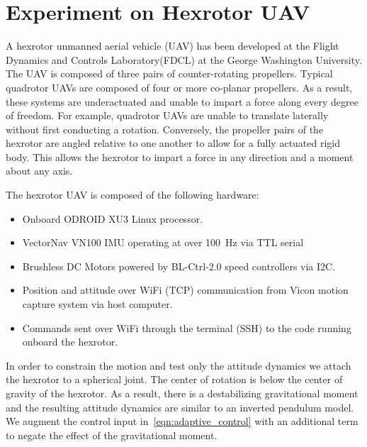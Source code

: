 \documentclass[letterpaper, 10 pt, conference]{ieeeconf}  %
\begin{document}
\section{Experiment on Hexrotor UAV}

A hexrotor unmanned aerial vehicle (UAV) has been developed at the Flight Dynamics and Controls Laboratory(FDCL) at the George Washington University.
The UAV is composed of three pairs of counter-rotating propellers. 
Typical quadrotor UAVs are composed of four or more co-planar propellers.
As a result, these systems are underactuated and unable to impart a force along every degree of freedom.
For example, quadrotor UAVs are unable to translate laterally without first conducting a rotation.
Conversely, the propeller pairs of the hexrotor are angled relative to one another to allow for a fully actuated rigid body.
This allows the hexrotor to impart a force in any direction and a moment about any axis. 

The hexrotor UAV is composed of the following hardware:
\begin{itemize}
	\item Onboard ODROID XU3 Linux processor.
	\item VectorNav VN100 IMU operating at over \SI{100}{\hertz} via TTL serial 
	\item Brushless DC Motors powered by BL-Ctrl-2.0 speed controllers via I2C.
	\item Position and attitude over WiFi (TCP) communication from Vicon motion capture system via host computer.
	\item Commands sent over WiFi through the terminal (SSH) to the code running onboard the hexrotor. 
\end{itemize}
In order to constrain the motion and test only the attitude dynamics we attach the hexrotor to a spherical joint.
The center of rotation is below the center of gravity of the hexrotor.
As a result, there is a destabilizing gravitational moment and the resulting attitude dynamics are similar to an inverted pendulum model.
We augment the control input in~\cref{eqn:adaptive_control} with an additional term to negate the effect of the gravitational moment.
\end{document}
